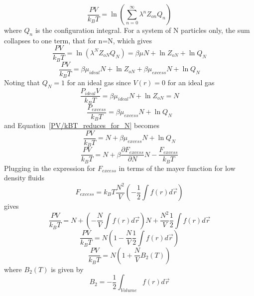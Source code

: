 \documentclass[double,12pt]{beavtex}
\begin{document}
\begin{equation}\frac{PV}{k_BT}=\ln{\left(\sum_{n=0}^\infty \lambda^nZ_{on}Q_n\right)} \end{equation}
where $Q_n$ is the configuration integral.
For a system of N particles only, the sum collapses to one term, 
that for n=N, which gives 
\begin{equation}\label{PV/kBT_reduces_for_N}\frac{PV}{k_BT}=\ln{\left(\lambda^NZ_{oN}Q_N\right)}
=\beta\mu{N} + \ln{Z}_{oN} +\ln{Q}_N\end{equation}
\begin{equation}\label{PV/kBT_reduces_for_N}\frac{PV}{k_BT}=\beta\mu_{ideal}{N} + \ln{Z}_{oN} + \beta\mu_{excess}{N} + \ln{Q}_N\end{equation}
Noting that $Q_N=1$ for an ideal gas since $V(r)=0$ for an ideal gas
\begin{equation}\frac{P_{ideal}V}{k_BT}=\beta\mu_{ideal}{N} + \ln{Z}_{oN}=N\end{equation}
\begin{equation}\frac{P_{excess}}{k_BT}= \beta\mu_{excess}{N} + \ln{Q}_N\end{equation}
and Equation~\ref{PV/kBT_reduces_for_N} becomes
\begin{equation}\frac{PV}{k_BT}=N + \beta\mu_{excess}{N} + \ln{Q}_N\end{equation}
\begin{equation}\frac{PV}{k_BT}=N + \beta\frac{\partial{F}_{excess}}{\partial{N}}{N} - \frac{F_{excess}}{k_BT}\end{equation}
Plugging in the expression for $F_{excess}$ in terms of the mayer function 
for low density fluids
\begin{equation}F_{excess}=k_BT\frac{N^2}{V}\left(-\frac{1}{2}\int{f(r)d\vec{r}}\right)\end{equation}
gives
\begin{equation}\frac{PV}{k_BT}=N + \left(-\frac{N}{V}\int{f(r)d\vec{r}}\right){N} + \frac{N^2}{V}\frac{1}{2}\int{f(r)d\vec{r}}\end{equation}
\begin{equation}\frac{PV}{k_BT}=N\left(1-\frac{N}{V}\frac{1}{2}\int{f(r)d\vec{r}}\right)\end{equation}
\begin{equation}\frac{PV}{k_BT}=N\left(1+\frac{N}{V}B_2(T)\right) \end{equation}
where $B_2(T)$ is given by
\begin{equation}B_2=-\frac{1}{2}\int_{Volume}f(r)d\vec{r} \end{equation}
\end{document}
